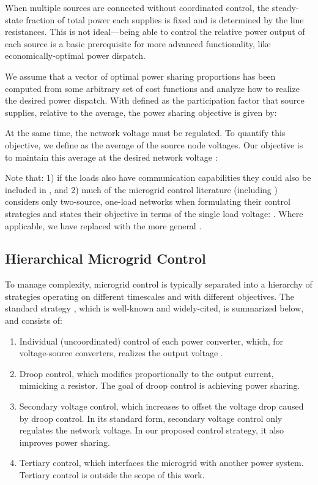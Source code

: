 \documentclass[letterpaper, 10 pt, conference]{ieeeconf}
\begin{document}
When multiple sources are connected without coordinated control, the steady-state fraction of total power each supplies is fixed and is determined by the line resistances. This is not ideal---being able to control the relative power output of each source is a basic prerequisite for more advanced functionality, like economically-optimal power dispatch.

We assume that a vector of optimal power sharing proportions  has been computed from some arbitrary set of cost functions and analyze how to realize the desired power dispatch. With  defined as the participation factor that source  supplies, relative to the average, the power sharing objective is given by:



At the same time, the network voltage must be regulated. To quantify this objective, we define  as the average of the source node voltages. Our objective is to maintain this average at the desired network voltage :



\noindent Note that: 1) if the loads also have communication capabilities they could also be included in , and 2) much of the microgrid control literature (including \cite{GuerreroHierarchy}) considers only two-source, one-load networks when formulating their control strategies and states their objective in terms of the single load voltage: . Where applicable, we have replaced  with the more general .


\subsection{Hierarchical Microgrid Control}

To manage complexity, microgrid control is typically separated into a hierarchy of strategies operating on different timescales and with different objectives. The standard strategy \cite{GuerreroHierarchy}, which is well-known and widely-cited, is summarized below, and consists of:
\begin{enumerate}
    \item Individual (uncoordinated) control of each power converter, which, for voltage-source converters, realizes the output voltage .
    \item Droop control, which modifies  proportionally to the output current, mimicking a resistor. The goal of droop control is achieving power sharing.
    \item Secondary voltage control, which increases  to offset the voltage drop caused by droop control. In its standard form, secondary voltage control only regulates the network voltage. In our proposed control strategy, it also improves power sharing.
    \item Tertiary control, which interfaces the microgrid with another power system. Tertiary control is outside the scope of this work.
\end{enumerate}
\end{document}
